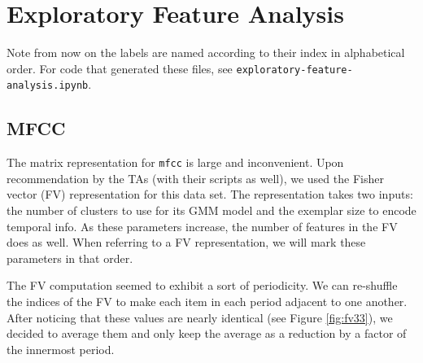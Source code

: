 \documentclass{article}
\begin{document}
\section{Exploratory Feature Analysis}

Note from now on the labels are named according to their index in alphabetical order. For code that generated these files, see \texttt{exploratory-feature-analysis.ipynb}.

\subsection{MFCC}

The matrix representation for \texttt{mfcc} is large and inconvenient. Upon recommendation by the TAs (with their scripts as well), we used the Fisher vector (FV) representation for this data set. The representation takes two inputs: the number of clusters to use for its GMM model and the exemplar size to encode temporal info. As these parameters increase, the number of features in the FV does as well. When referring to a FV representation, we will mark these parameters in that order.

The FV computation seemed to exhibit a sort of periodicity. We can re-shuffle the indices of the FV to make each item in each period adjacent to one another. After noticing that these values are nearly identical (see Figure \ref{fig:fv33}), we decided to average them and only keep the average as a reduction by a factor of the innermost period.
\end{document}
